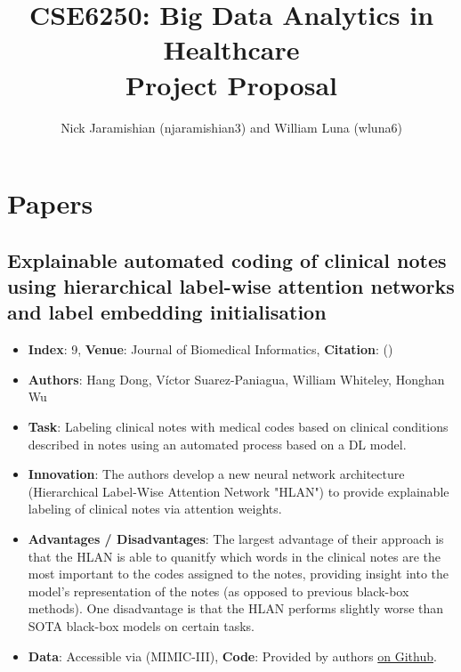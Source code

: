 \documentclass[
	letterpaper, %
]{jdf}
\title{CSE6250: Big Data Analytics in Healthcare \\ Project Proposal}
\author{Nick Jaramishian (njaramishian3) and William Luna (wluna6)}
\newcommand{\pcite}[1]{(\cite{#1})}
\begin{document}
\maketitle

\section{Papers}

\subsection{Explainable automated coding of clinical notes using hierarchical label-wise attention networks and label embedding initialisation}
\begin{itemize}[noitemsep,topsep=0pt,parsep=0pt,partopsep=0pt]
\item \textbf{Index}: 9, \textbf{Venue}: Journal of Biomedical Informatics, \textbf{Citation}: \pcite{explainable_note_coding}
\item \textbf{Authors}: Hang Dong, Víctor Suarez-Paniagua, William Whiteley, Honghan Wu 
\item \textbf{Task}: Labeling clinical notes with medical codes based on clinical conditions described in notes using an automated process based on a DL model.
\item \textbf{Innovation}: The authors develop a new neural network architecture (Hierarchical Label-Wise Attention Network "HLAN") to provide explainable labeling of clinical notes via attention weights. 
\item \textbf{Advantages / Disadvantages}: The largest advantage of their approach is that the HLAN is able to quanitfy which words in the clinical notes are the most important to the codes assigned to the notes, providing insight into the model's representation of the notes (as opposed to previous black-box methods). One disadvantage is that the HLAN performs slightly worse than SOTA black-box models on certain tasks. 
\item \textbf{Data}: Accessible via (MIMIC-III), \textbf{Code}: Provided by authors \href{https://github.com/acadTags/Explainable-Automated-Medical-Coding}{on Github}.
\end{itemize}
\end{document}
